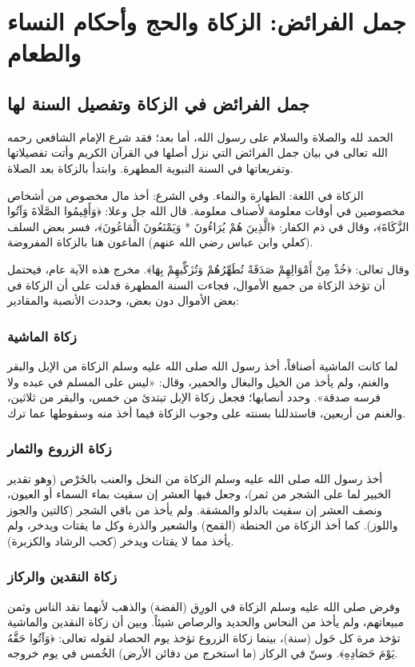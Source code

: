 \chapter{جمل الفرائض: الزكاة والحج وأحكام النساء والطعام}

\section{جمل الفرائض في الزكاة وتفصيل السنة لها}
الحمد لله والصلاة والسلام على رسول الله، أما بعد؛ فقد شرع الإمام الشافعي رحمه الله تعالى في بيان جمل الفرائض التي نزل أصلها في القرآن الكريم وأتت تفصيلاتها وتفريعاتها في السنة النبوية المطهرة. وابتدأ بالزكاة بعد الصلاة.

الزكاة في اللغة: الطهارة والنماء. وفي الشرع: أخذ مال مخصوص من أشخاص مخصوصين في أوقات معلومة لأصناف معلومة.
قال الله جل وعلا: ﴿وَأَقِيمُوا الصَّلَاةَ وَآتُوا الزَّكَاةَ﴾، وقال في ذم الكفار: ﴿الَّذِينَ هُمْ يُرَاءُونَ * وَيَمْنَعُونَ الْمَاعُونَ﴾، فسر بعض السلف (كعلي وابن عباس رضي الله عنهم) الماعون هنا بالزكاة المفروضة. 

وقال تعالى: ﴿خُذْ مِنْ أَمْوَالِهِمْ صَدَقَةً تُطَهِّرُهُمْ وَتُزَكِّيهِمْ بِهَا﴾. مخرج هذه الآية عام، فيحتمل أن تؤخذ الزكاة من جميع الأموال، فجاءت السنة المطهرة فدلت على أن الزكاة في بعض الأموال دون بعض، وحددت الأنصبة والمقادير:

\subsection{زكاة الماشية}
لما كانت الماشية أصنافاً، أخذ رسول الله صلى الله عليه وسلم الزكاة من الإبل والبقر والغنم، ولم يأخذ من الخيل والبغال والحمير، وقال: «ليس على المسلم في عبده ولا فرسه صدقة». وحدد أنصابها؛ فجعل زكاة الإبل تبتدئ من خمس، والبقر من ثلاثين، والغنم من أربعين، فاستدللنا بسنته على وجوب الزكاة فيما أخذ منه وسقوطها عما ترك.

\subsection{زكاة الزروع والثمار}
أخذ رسول الله صلى الله عليه وسلم الزكاة من النخل والعنب بالخَرْص (وهو تقدير الخبير لما على الشجر من ثمر)، وجعل فيها العشر إن سقيت بماء السماء أو العيون، ونصف العشر إن سقيت بالدلو والمشقة. ولم يأخذ من باقي الشجر (كالتين والجوز واللوز).
كما أخذ الزكاة من الحنطة (القمح) والشعير والذرة وكل ما يقتات ويدخر، ولم يأخذ مما لا يقتات ويدخر (كحب الرشاد والكزبرة).

\subsection{زكاة النقدين والركاز}
وفرض صلى الله عليه وسلم الزكاة في الورِق (الفضة) والذهب لأنهما نقد الناس وثمن مبيعاتهم، ولم يأخذ من النحاس والحديد والرصاص شيئاً. وبين أن زكاة النقدين والماشية تؤخذ مرة كل حَول (سنة)، بينما زكاة الزروع تؤخذ يوم الحصاد لقوله تعالى: ﴿وَآتُوا حَقَّهُ يَوْمَ حَصَادِهِ﴾. وسنّ في الركاز (ما استخرج من دفائن الأرض) الخُمس في يوم خروجه.

